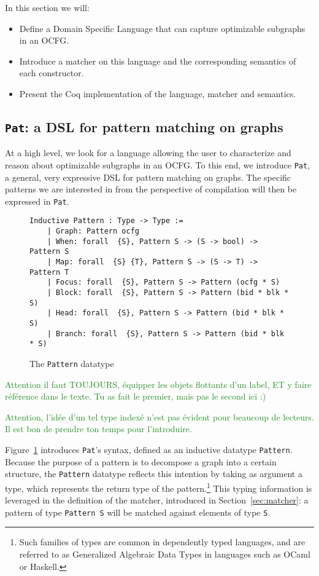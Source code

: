 \documentclass[11pt]{article}
\newcommand{\inlinecoq}[1]{\mbox{\lstinline[style=customcoq,columns=fixed,basewidth=.48em]{#1}}}
\newcommand{\ilc}[1]{\inlinecoq{#1}}
\newcommand{\yz}[1]{\textcolor{ForestGreen}{#1}}
\newcommand{\yzt}[1]{\textcolor{ForestGreen!50}{#1}}
\newcommand{\cut}[1]{\textcolor{Gray!40}{#1}}
\newcommand{\ocfg}{OCFG\xspace}
\newcommand{\pat}{\texttt{Pat}\xspace}
\begin{document}
\cut{
In this section we will:\begin{itemize}
  \item Define a Domain Specific Language that can capture optimizable subgraphs in an \ocfg\@.
  \item Introduce a matcher on this language and the corresponding semantics of each constructor.
  \item Present the Coq implementation of the language, matcher and semantics.
\end{itemize}
}

\subsection{\pat: a DSL for pattern matching on graphs}

\yzt{At a high level, we look for a language allowing the user to characterize and reason about optimizable subgraphs in an \ocfg. 
To this end, we introduce \pat, a general, very expressive DSL for pattern matching on graphs. The specific patterns we are interested in from the perspective of compilation will then be expressed in \pat.}

\begin{figure}[h]
  \begin{lstlisting}[style=customcoq,basicstyle=\small\ttfamily]
    Inductive Pattern : Type -> Type :=
    | Graph: Pattern ocfg
    | When: forall  {S}, Pattern S -> (S -> bool) -> Pattern S
    | Map: forall  {S} {T}, Pattern S -> (S -> T) -> Pattern T
    | Focus: forall  {S}, Pattern S -> Pattern (ocfg * S)
    | Block: forall  {S}, Pattern S -> Pattern (bid * blk * S)
    | Head: forall  {S}, Pattern S -> Pattern (bid * blk * S)
    | Branch: forall  {S}, Pattern S -> Pattern (bid * blk * S)
  \end{lstlisting}
  \label{fig:pat}
  \caption{The \ilc{Pattern} datatype}
\end{figure}

\yz{Attention il faut TOUJOURS, équipper les objets flottants d'un label, ET y faire référence dans le texte. Tu as fait le premier, mais pas le second ici :)}

\yz{Attention, l'idée d'un tel type indexé n'est pas évident pour beaucoup de lecteurs. Il est bon de prendre ton temps pour l'introduire.}

Figure~\ref{fig:pat} introduces \pat{}'s syntax, defined as an inductive datatype \ilc{Pattern}.
Because the purpose of a pattern is to decompose a graph into a certain structure, the \ilc{Pattern} datatype reflects this intention by taking as argument a type, which represents the return type of the pattern.\footnote{Such families of types are common in dependently typed languages, and are referred to as Generalized Algebraic Data Types in languages such as OCaml or Haskell.}
This typing information is leveraged in the definition of the matcher, introduced in Section~\ref{sec:matcher}: a pattern of type \ilc{Pattern S} will be matched against elements of type \ilc{S}.
\end{document}
